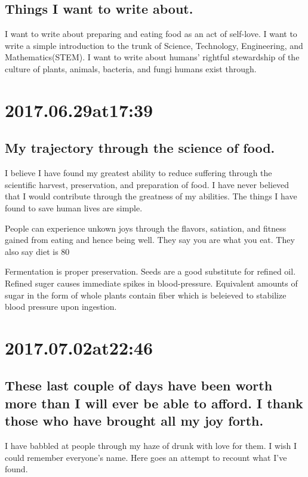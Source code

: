 \subsection*{ Things I want to write about. }
I want to write about preparing and eating food as an act of self-love. I want to write a simple introduction to the trunk of Science, Technology, Engineering, and Mathematics(STEM). I want to write about humans' rightful stewardship of the culture of plants, animals, bacteria, and fungi humans exist through.

\section*{ 2017.06.29at17:39 }
\subsection*{ My trajectory through the science of food. }
I believe I have found my greatest ability to reduce suffering through the scientific harvest, preservation, and preparation of food. I have never believed that I would contribute through the greatness of my abilities. The things I have found to save human lives are simple.

People can experience unkown joys through the flavors, satiation, and fitness gained from eating and hence being well. They say you are what you eat. They also say diet is 80%

Fermentation is proper preservation. Seeds are a good substitute for refined oil. Refined suger causes immediate spikes in blood-pressure. Equivalent amounts of sugar in the form of whole plants contain fiber which is beleieved to stabilize blood pressure upon ingestion.

\section*{ 2017.07.02at22:46 }
\subsection*{ These last couple of days have been worth more than I will ever be able to afford. I thank those who have brought all my joy forth. }
I have babbled at people through my haze of drunk with love for them. I wish I could remember everyone's name. Here goes an attempt to recount what I've found.

